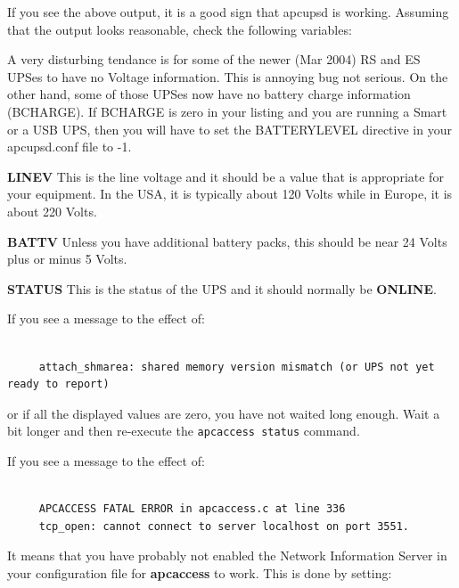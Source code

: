 {{If you see the above output, it is a good sign that apcupsd is working.
Assuming that the output looks reasonable, check the following variables:  

A very disturbing tendance is for some of the newer (Mar 2004) RS and ES UPSes
to have no Voltage information.  This is annoying bug not serious.  On the
other hand, some of those UPSes now have no battery charge information
(BCHARGE).  If BCHARGE is zero in your listing and you are running a Smart or
a USB UPS, then you will have to set the BATTERYLEVEL directive in your
apcupsd.conf file to -1.  

\begin{description}

\item {\bf LINEV}
This is the line voltage and it should be a value that is appropriate for your
equipment. In the USA, it is typically about 120 Volts while in Europe, it is
about 220 Volts.  

\item {\bf BATTV}
Unless you have additional battery packs, this should be near 24 Volts plus or
minus 5 Volts.  

\item {\bf STATUS}
This is the status of the UPS and it should normally be {\bf ONLINE}. 
\end{description}

If you see a message to the effect of: 

\footnotesize
\begin{verbatim}
     
     attach_shmarea: shared memory version mismatch (or UPS not yet ready to report)
\end{verbatim}
\normalsize

or if all the displayed values are zero, you have not waited long enough. Wait
a bit longer and then re-execute the {\tt apcaccess status} command.  

If you see a message to the effect of: 

\footnotesize
\begin{verbatim}
     
     APCACCESS FATAL ERROR in apcaccess.c at line 336
     tcp_open: cannot connect to server localhost on port 3551.
\end{verbatim}
\normalsize

It means that you have probably not enabled the Network Information Server in
your configuration file for {\bf apcaccess} to work. This is done by setting: 

}}
